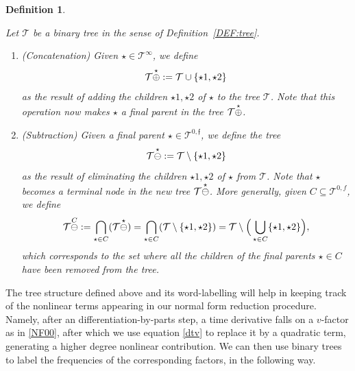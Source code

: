 \documentclass[a4paper,
11pt,  reqno]{amsart}
\makeatletter
\newcommand{\5}{\textup{V}}
\newtheorem{definition}[theorem]{Definition}
\theoremstyle{remark}
\newcommand{\TT}{\mathcal{T}}
\newcommand{\ff}{\mathfrak{f}}
\def\<#1>{\csname MH@symb@#1\endcsname}
\numberwithin{equation}{section}
\numberwithin{theorem}{section}
\makeatother
\begin{document}
\begin{definition} 
\label{DEF:tree3}
\rm

Let $\TT$ be a binary tree in the sense of Definition~\ref{DEF:tree}. 


\begin{enumerate}




\smallskip
\item[(i)] (Concatenation)  
Given $ \star \in \TT^\infty$, we define
$$
\TT \overset{\star}{\oplus} \<1>
: = \TT \cup \{\star1, \star2\}
$$
as the result of adding the children $\star1,\star2$ of $\star$ to the tree $\TT$. 
Note that this operation now makes $\star$ a final parent in the tree $\TT \overset{\star}{\oplus} \<1>$. 




\smallskip
\item[(ii)] (Subtraction) 
Given a final parent $\star  \in \TT^{0,\ff}$, we define the tree
$$
\TT \overset{\star }{\ominus } \<1>
: = \TT \setminus \{ \star1, \star2  \}
$$
as the result of eliminating the children $\star1, \star2$ of $\star$
from $\TT$. Note that $\star$ becomes a terminal node in the new tree $\TT \overset{\star}{\ominus } \<1>$. 
More generally, given $C\subseteq \TT^{0,f}$, we define
\begin{align}
\label{treeSubtr}
\TT \overset{C}{\ominus} \<1> : =
 \bigcap_{\star \in C} ( \TT \overset{\star}{\ominus}  \<1>)
= \bigcap_{\star\in C} (\TT \setminus \{\star1,\star2\})
= \TT \setminus \Big( \bigcup_{\star\in C} \{\star1,\star2\} \Big), 
\end{align}
which corresponds to the set where all the children of the final parents $\star\in C$ have been removed from the tree.


\end{enumerate}



\end{definition}



The tree structure defined above and its word-labelling will help in keeping track of the nonlinear terms appearing in our normal form reduction procedure. Namely, after an differentiation-by-parts step, a time derivative falls on a $v$-factor as in \eqref{NF00}, after which we use equation \eqref{dtv} to replace it by a quadratic term, generating a higher degree nonlinear contribution. We can then use binary trees to label the frequencies of the corresponding factors, in the following way. 
\end{document}
